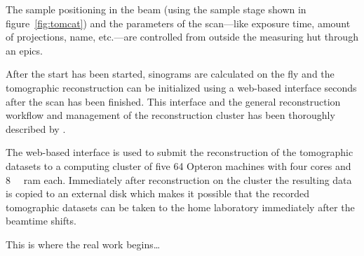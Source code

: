 The sample positioning in the beam (using the sample stage shown in figure~\ref{fig:tomcat}) and the parameters of the scan---like exposure time, amount of projections, name, etc.---are controlled from outside the measuring hut through an \ac{epics}.

After the start has been started, sinograms are calculated on the fly and the tomographic reconstruction can be initialized using a web-based interface seconds after the scan has been finished. This interface and the general reconstruction workflow and management of the reconstruction cluster has been thoroughly described by \citet{Hintermueller2010}.

The web-based interface is used to submit the reconstruction of the tomographic datasets to a computing cluster of five \SI{64}{\bit} Opteron machines with four cores and \SI{8}{\giga\byte} \acs{ram} each. Immediately after reconstruction on the cluster the resulting data is copied to an external disk which makes it possible that the recorded tomographic datasets can be taken to the home laboratory immediately after the beamtime shifts.

This is where the real work begins\ldots